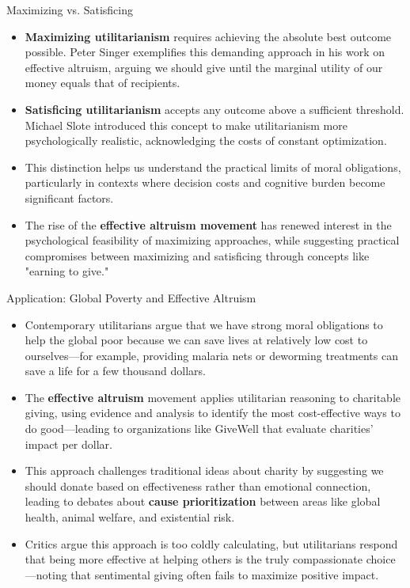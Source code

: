 \documentclass[aspectratio=169]{beamer}
\begin{document}
 \begin{frame}{Maximizing vs. Satisficing}
    \begin{itemize}
        \item \textbf{Maximizing utilitarianism} requires achieving the absolute best outcome possible. Peter Singer exemplifies this demanding approach in his work on effective altruism, arguing we should give until the marginal utility of our money equals that of recipients.
        
        \item \textbf{Satisficing utilitarianism} accepts any outcome above a sufficient threshold. Michael Slote introduced this concept to make utilitarianism more psychologically realistic, acknowledging the costs of constant optimization.
        
        \item This distinction helps us understand the practical limits of moral obligations, particularly in contexts where decision costs and cognitive burden become significant factors.
        
        \item The rise of the \textbf{effective altruism movement} has renewed interest in the psychological feasibility of maximizing approaches, while suggesting practical compromises between maximizing and satisficing through concepts like "earning to give."
    \end{itemize}
 \end{frame}

\begin{frame}{Application: Global Poverty and Effective Altruism}
    \begin{itemize}
        \item Contemporary utilitarians argue that we have strong moral obligations to help the global poor because we can save lives at relatively low cost to ourselves—for example, providing malaria nets or deworming treatments can save a life for a few thousand dollars.
        
        \item The \textbf{effective altruism} movement applies utilitarian reasoning to charitable giving, using evidence and analysis to identify the most cost-effective ways to do good—leading to organizations like GiveWell that evaluate charities' impact per dollar.
        
        \item This approach challenges traditional ideas about charity by suggesting we should donate based on effectiveness rather than emotional connection, leading to debates about \textbf{cause prioritization} between areas like global health, animal welfare, and existential risk.
        
        \item Critics argue this approach is too coldly calculating, but utilitarians respond that being more effective at helping others is the truly compassionate choice—noting that sentimental giving often fails to maximize positive impact.
    \end{itemize}
\end{frame}
\end{document}
